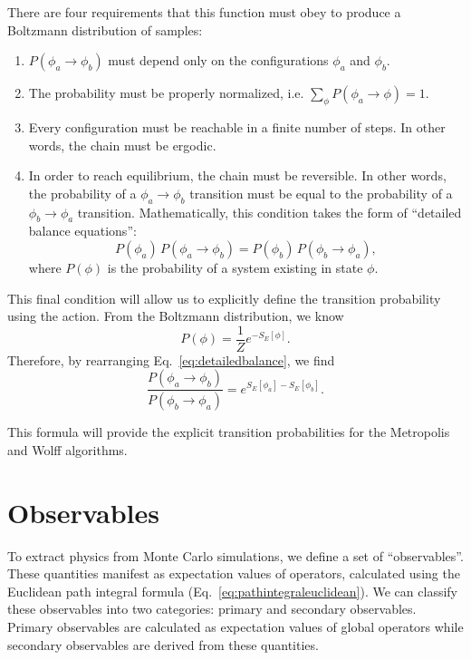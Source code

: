 There are four requirements that this function must obey to produce a Boltzmann distribution of samples:
\begin{enumerate}
    \item $P(\phi_a \rightarrow \phi_b)$ must depend only on the configurations $\phi_a$ and $\phi_b$.
    \item The probability must be properly normalized, i.e. $\sum_{\phi} P(\phi_a \rightarrow \phi) = 1$.
    \item Every configuration must be reachable in a finite number of steps. In other words, the chain must be ergodic.
    \item In order to reach equilibrium, the chain must be reversible. In other words, the probability of a $\phi_a\rightarrow\phi_b$ transition must be equal to the probability of a $\phi_b\rightarrow\phi_a$ transition. Mathematically, this condition takes the form of ``detailed balance equations'':
\begin{equation}
    \label{eq:detailedbalance}
    P(\phi_a)\,P(\phi_a\rightarrow\phi_b) = P(\phi_b)\,P(\phi_b\rightarrow\phi_a),
\end{equation}
where $P(\phi)$ is the probability of a system existing in state $\phi$.
\end{enumerate}
This final condition will allow us to explicitly define the transition probability using the action. From the Boltzmann distribution, we know
\begin{equation}
    P(\phi) = \frac{1}{Z} e^{-S_E[\phi]}.
\end{equation}
Therefore, by rearranging Eq.~\ref{eq:detailedbalance}, we find
\begin{equation}
    \label{eq:detailedbalance2}
    \frac{P(\phi_a\rightarrow\phi_b)}{P(\phi_b\rightarrow\phi_a)} = e^{S_E[\phi_a] - S_E[\phi_b]}.
\end{equation}

This formula will provide the explicit transition probabilities for the Metropolis and Wolff algorithms.




\section{Observables}

To extract physics from Monte Carlo simulations, we define a set of ``observables''. These quantities manifest as expectation values of operators, calculated using the Euclidean path integral formula (Eq.~\ref{eq:pathintegraleuclidean}). We can classify these observables into two categories: primary and secondary observables. Primary observables are calculated as expectation values of global operators while secondary observables are derived from these quantities.


